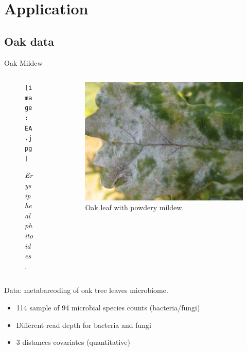 \documentclass{beamer}
\begin{document}
\section{Application}
\subsection{Oak data}


\begin{frame}{Oak Mildew}
\begin{columns}
\begin{column}{5cm}
\begin{figure}[htp]
\centering
\texttt{[image: EA.jpg]}
\caption{\textit{Erysiphe alphitoides.}}
\end{figure}
\end{column}
\begin{column}{6cm}
\begin{figure}[htp]
\centering
\includegraphics[scale=0.1]{mildew.jpg}
\caption{Oak leaf with powdery mildew.}
\end{figure}
\end{column}
\end{columns}
\vspace{0.5cm}
Data: metabarcoding of oak tree leaves microbiome.\\

\begin{itemize}
	\item 114 sample of 94 microbial species counts (bacteria/fungi)
	\item Different read depth for bacteria and fungi
	\item 3 distances covariates (quantitative)
\end{itemize}
\end{frame}
\end{document}
